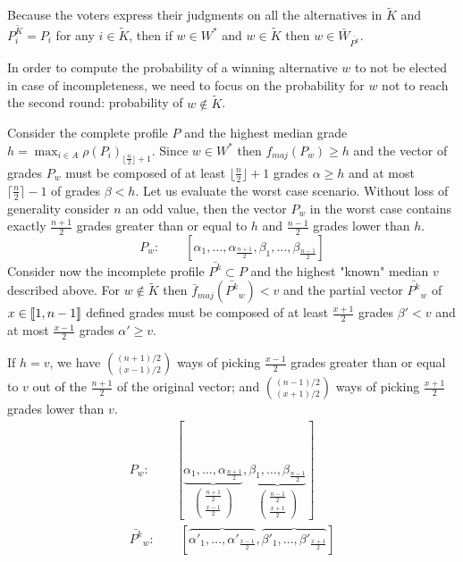 \documentclass[version=3.21, pagesize, twoside=off, bibliography=totoc, DIV=calc, fontsize=12pt, a4paper]{scrartcl}
\begin{document}
Because the voters express their judgments on all the alternatives in $\tilde{K}$ 
and $P^{\tilde{K}}_{i} = P_i$ for any $i \in \tilde{K}$, then if $w \in W^*$ and $w \in \tilde{K}$ then $w \in \bar{W}_{\bar{P^k}}$.

In order to compute the probability of a winning alternative $w$ to not be elected in case of incompleteness, we need to focus on the probability for $w$ not to reach the second round: probability of $w \notin \tilde{K}$.

Consider the complete profile $P$ and the highest median grade $h=\max_{i\in A}\rho(P_i)_{\lfloor \frac{n}{2} \rfloor + 1}$. Since $w \in W^*$ then $f_{maj}(P_{w})\geq h$ and the vector of grades $P_w$ must be composed of at least $\lfloor \frac{n}{2}\rfloor+1$ grades $\alpha \geq h$ and at most $\lceil \frac{n}{2}\rceil-1$ of grades $\beta < h$. Let us evaluate the worst case scenario.
Without loss of generality consider $n$ an odd value, then the vector $P_{w}$ in the worst case contains exactly $\frac{n+1}{2}$ grades greater than or equal to $h$ and $\frac{n-1}{2}$ grades lower than $h$.
\[P_w : \qquad [ \alpha_1, \dots , \alpha_{\frac{n+1}{2}}, \beta_1, \dots , \beta_{\frac{n-1}{2}} ] \]
Consider now the incomplete profile $\bar{P^k} \subset P$ and the highest "known" median $v$ described above. For $w \notin \tilde{K}$ then $\bar{f}_{maj}(\bar{P^k}_w) < v$ and the partial vector $\bar{P^k}_w$ of $x\in \llbracket1,n-1\rrbracket$ defined grades must be composed of at least $\frac{x+1}{2}$ grades $\beta'<v$ and at most $\frac{x-1}{2}$ grades $\alpha' \geq v$. 

If $h=v$, we have $\binom{(n+1)/2}{(x-1)/2}$ ways of picking $\frac{x-1}{2}$ grades greater than or equal to $v$ out of the $\frac{n+1}{2}$ of the original vector; and $\binom{(n-1)/2}{(x+1)/2}$ ways of picking $\frac{x+1}{2}$ grades lower than $v$.
\begin{align}
	P_{w}: \qquad [ \underbrace{\alpha_1, \dots , \alpha_{\frac{n+1}{2}}}_{\begin{pmatrix}\frac{n+1}{2} \\ \frac{x-1}{2}\end{pmatrix}}, \underbrace{\beta_1, \dots , \beta_{\frac{n-1}{2}}}_{\begin{pmatrix}\frac{n-1}{2} \\ {\frac{x+1}{2}}\end{pmatrix}} ] \\
	\bar{P^k}_w:\qquad [ \overbrace{\alpha'_1, \dots , \alpha'_{\frac{x-1}{2}}}, \overbrace{\beta'_1, \dots , \beta'_{\frac{x+1}{2}}}]
\end{align} 
\newcommand{\largemath}[1]{{\mathlarger{\mathlarger{\mathlarger{\mathlarger{\mathlarger#1}}}}}}
\end{document}
